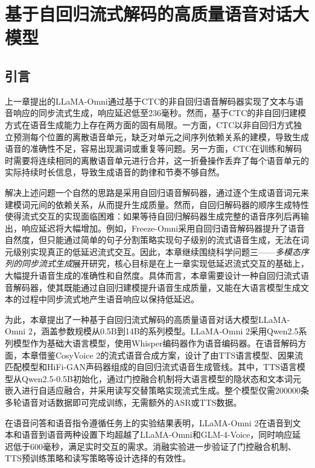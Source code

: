 \chapter{基于自回归流式解码的高质量语音对话大模型}\label{chap:llama-omni2}

\section{引言}

上一章提出的LLaMA-Omni通过基于CTC的非自回归语音解码器实现了文本与语音响应的同步流式生成，响应延迟低至236毫秒。然而，基于CTC的非自回归建模方式在语音生成能力上存在两方面的固有局限。一方面，CTC以非自回归方式独立预测每个位置的离散语音单元，缺乏对单元之间序列依赖关系的建模，导致生成语音的准确性不足，容易出现漏词或重复等问题。另一方面，CTC在训练和解码时需要将连续相同的离散语音单元进行合并，这一折叠操作丢弃了每个语音单元的实际持续时长信息，导致生成语音的韵律和节奏不够自然。

解决上述问题一个自然的思路是采用自回归语音解码器，通过逐个生成语音词元来建模词元间的依赖关系，从而提升生成质量。然而，自回归解码器的顺序生成特性使得流式交互的实现面临困难：如果等待自回归解码器生成完整的语音序列后再输出，响应延迟将大幅增加。例如，Freeze-Omni\citep{xiong2024freeze}采用自回归语音解码器提升了语音自然度，但只能通过简单的句子分割策略实现句子级别的流式语音生成，无法在词元级别实现真正的低延迟流式交互。因此，本章继续围绕科学问题三——\textit{多模态序列的同步流式生成}展开研究，核心目标是在上一章实现低延迟流式交互的基础上，大幅提升语音生成的准确性和自然度。具体而言，本章需要设计一种自回归流式语音解码器，使其既能通过自回归建模提升语音生成质量，又能在大语言模型生成文本的过程中同步流式地产生语音响应以保持低延迟。

为此，本章提出了一种基于自回归流式解码的高质量语音对话大模型LLaMA-Omni 2，涵盖参数规模从0.5B到14B的系列模型。LLaMA-Omni 2采用Qwen2.5系列模型\citep{yang2025qwen25}作为基础大语言模型，使用Whisper\citep{whisper}编码器作为语音编码器。在语音解码方面，本章借鉴CosyVoice 2\citep{du2024cosyvoice}的流式语音合成方案，设计了由TTS语言模型、因果流匹配模型和HiFi-GAN声码器组成的自回归流式语音生成管线。其中，TTS语言模型从Qwen2.5-0.5B初始化，通过门控融合机制将大语言模型的隐状态和文本词元嵌入进行自适应融合，并采用读写交替策略实现流式生成。整个模型仅需200000条多轮语音对话数据即可完成训练，无需额外的ASR或TTS数据。

在语音问答和语音指令遵循任务上的实验结果表明，LLaMA-Omni 2在语音到文本和语音到语音两种设置下均超越了LLaMA-Omni和GLM-4-Voice\citep{glm4voice}，同时响应延迟低于600毫秒，满足实时交互的需求。消融实验进一步验证了门控融合机制、TTS预训练策略和读写策略等设计选择的有效性。


